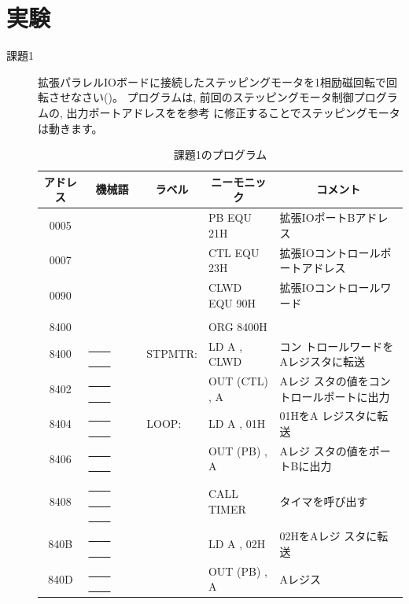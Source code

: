 \newpage

\section{実験}

\begin{description}
\item[課題1] 拡張パラレルIOボードに接続したステッピングモータを1相励磁回転で回転させなさい()。
           プログラムは, 前回のステッピングモータ制御プログラムの, 出力ポートアドレスをを参考
           に修正することでステッピングモータは動きます。

\begin{table}
\begin{center}
\caption{課題1のプログラム}
\label{tab:q3-1}
\footnotesize
\begin{tabular}{|c|l|ll|l|}
\hline
アドレス& \multicolumn{1}{|c|}{機械語}&\multicolumn{1}{|c}{ラベル}&\multicolumn{1}{c|}{ニーモニック}&\multicolumn{1}{|c|}{コメント}\\
\hline
   0005 &            &   &PB EQU 21H& 拡張IOポートBアドレス\\
   0007 &            &   &CTL EQU 23H& 拡張IOコントロールポートアドレス\\
   0090 &            &   &CLWD EQU 90H& 拡張IOコントロールワード\\
        &            &   &&\\
   8400 &            &   &    ORG 8400H&\\
   8400 &  \underline{~~~~} \underline{~~~~}     &   STPMTR:& LD A , CLWD& コン
                    トロールワードをAレジスタに転送\\
   8402 &  \underline{~~~~} \underline{~~~~}      &   &    OUT (CTL) , A & Aレジ
                    スタの値をコントロールポートに出力\\
   8404 &  \underline{~~~~} \underline{~~~~}       &   LOOP:& LD A , 01H& 01HをA
                    レジスタに転送\\
   8406 &  \underline{~~~~} \underline{~~~~}      &   &   OUT (PB) , A   & Aレジ
                    スタの値をポートBに出力\\
   8408 &  \underline{~~~~} \underline{~~~~}  \underline{~~~~}   &   &   CALL
                TIMER&  タイマを呼び出す\\
   840B &  \underline{~~~~} \underline{~~~~}      &   &   LD A , 02H& 02HをAレジ
                    スタに転送\\
   840D &  \underline{~~~~} \underline{~~~~}     &   &   OUT (PB) , A  & Aレジス

\end{tabular}
\end{center}
\end{table}
\end{description}
